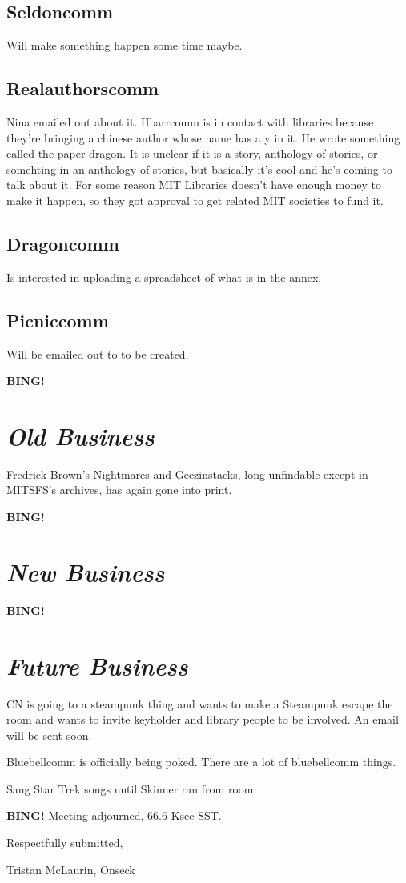 \documentclass[10pt]{article}
\newcommand{\bing}{{\bf BING!} }
\newcommand{\goto}[1]{\bing \vskip 12pt \section*{{\em{#1}}}}
\newcommand{\onseck}{Tristan McLaurin, Onseck}
\begin{document}
\subsection*{Seldoncomm}
Will make something happen some time maybe.

\subsection*{Realauthorscomm}
Nina emailed out about it. Hbarrcomm is in contact with libraries because they're bringing a chinese author whose name has a y in it. He wrote something called the paper dragon. It is unclear if it is a story, anthology of stories, or somehting in an anthology of stories, but basically it's cool and he's coming to talk about it. For some reason MIT Libraries doesn't have enough money to make it happen, so they got approval to get related MIT societies to fund it.

\subsection*{Dragoncomm}
Is interested in uploading a spreadsheet of what is in the annex.

\subsection*{Picniccomm}
Will be emailed out to to be created.

\goto{Old Business}
Fredrick Brown's Nightmares and Geezinstacks, long unfindable except in MITSFS's archives, has again gone into print.

\goto{New Business}


\goto{Future Business}
CN is going to a steampunk thing and wants to make a Steampunk escape the room and wants to invite keyholder and library people to be involved. An email will be sent soon.

Bluebellcomm is officially being poked. There are a lot of bluebellcomm things.

Sang Star Trek songs until Skinner ran from room.

\bing
\noindent
Meeting adjourned, 66.6 Ksec SST.

\vspace{18pt}

\centerline{Respectfully submitted,}
\centerline{\onseck}
\end{document}
